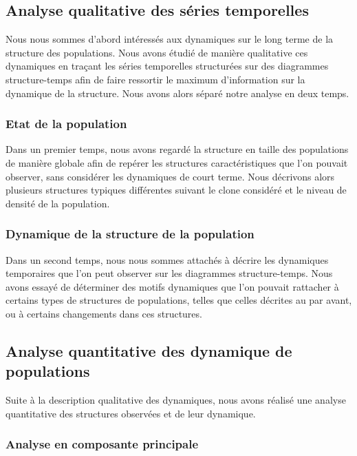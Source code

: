 \subsection{Analyse qualitative des séries temporelles}

Nous nous sommes d'abord intéressés aux dynamiques sur le long
terme de la structure des populations. Nous avons étudié de manière
qualitative ces dynamiques en traçant les séries temporelles structurées sur des
diagrammes structure-temps afin de faire ressortir le maximum d'information sur
la dynamique de la structure.
Nous avons alors séparé notre analyse en deux temps.

\subsubsection{Etat de la population}

Dans un premier temps, nous avons regardé la structure en taille des populations
de manière globale afin de repérer les structures caractéristiques que l'on
pouvait observer, sans considérer les dynamiques de court terme. Nous décrivons
alors plusieurs structures typiques différentes suivant le clone considéré et le
niveau de densité de la population.

\subsubsection{Dynamique de la structure de la population}

Dans un second temps, nous nous sommes attachés à décrire les dynamiques
temporaires que l'on peut observer sur les diagrammes structure-temps. Nous
avons essayé de déterminer des motifs dynamiques que l'on pouvait rattacher à
certains types de structures de populations, telles que celles décrites au
par avant, ou à certains changements dans ces structures.

\subsection{Analyse quantitative des dynamique de populations}

Suite à la description qualitative des dynamiques, nous avons réalisé une
analyse quantitative des structures observées et de leur dynamique. 

\subsubsection{Analyse en composante principale}

